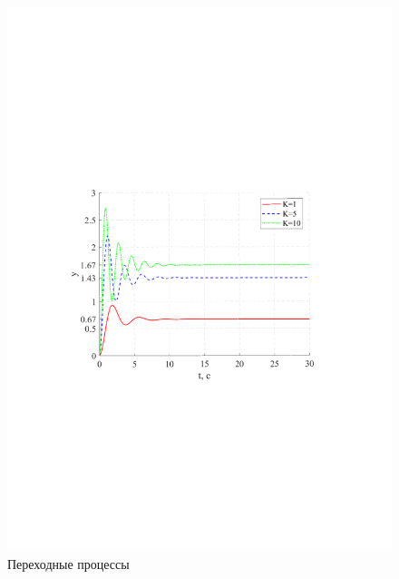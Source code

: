 \documentclass[a4paper,12pt]{article}
\begin{document}
	\begin{figure}[h!]
			\begin{center}
		\renewcommand{\figurename}{Рисунок}
		\includegraphics[width=5in]{ph1MOD.pdf}
		\caption{Переходные процессы} 
		\label{s_2} 
		\end{center}
	\end{figure}		
\end{document}
